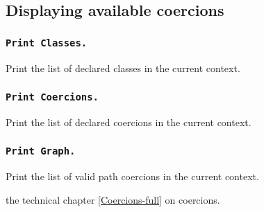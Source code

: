 \subsection{Displaying available coercions}

\subsubsection{\tt Print Classes.}
Print the list of declared classes in the current context.

\subsubsection{\tt Print Coercions.}
Print the list of declared coercions in the current context.

\subsubsection{\tt Print Graph.}
Print the list of valid path coercions in the current context.

\SeeAlso the technical chapter \ref{Coercions-full} on coercions.

